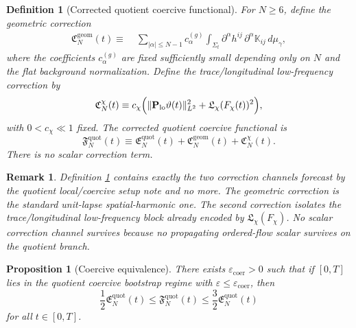 \documentclass[11pt]{article}
\newtheorem{definition}{Definition}
\newtheorem{proposition}{Proposition}
\newtheorem{remark}{Remark}
\begin{document}
\begin{definition}[Corrected quotient coercive functional]
\label{def:F}
For \(N\ge 6\), define the geometric correction
\begin{align}
\mathfrak C_N^{\mathrm{geom}}(t)
\equiv\;&
\sum_{|\alpha|\le N-1} c_\alpha^{(g)}
\int_{\Sigma_t}
\partial^\alpha h^{ij}\,
\partial^\alpha \mathbb K_{ij}\,d\mu_\gamma,
\label{eq:Cgeom}
\end{align}
where the coefficients \(c_\alpha^{(g)}\) are fixed sufficiently small depending only on \(N\) and the flat background normalization. Define the trace/longitudinal low-frequency correction by
\begin{equation}
\mathfrak C_N^{\chi}(t)
\equiv
c_\chi
\Bigl(
\|\mathbf P_{\mathrm{lo}}\vartheta(t)\|_{L^2}^2
+\mathfrak L_\chi(F_\chi(t))^2
\Bigr),
\label{eq:Cchi}
\end{equation}
with \(0<c_\chi\ll 1\) fixed. The \emph{corrected quotient coercive functional} is
\begin{equation}
\mathfrak F_N^{\mathrm{quot}}(t)
\equiv
\mathfrak E_N^{\mathrm{quot}}(t)
+\mathfrak C_N^{\mathrm{geom}}(t)
+\mathfrak C_N^{\chi}(t).
\label{eq:Fquot}
\end{equation}
There is no scalar correction term.
\end{definition}

\begin{remark}
Definition \ref{def:F} contains exactly the two correction channels forecast by the quotient local/coercive setup note and no more. The geometric correction is the standard unit-lapse spatial-harmonic one. The second correction isolates the trace/longitudinal low-frequency block already encoded by \(\mathfrak L_\chi(F_\chi)\). No scalar correction channel survives because no propagating ordered-flow scalar survives on the quotient branch.
\end{remark}

\begin{proposition}[Coercive equivalence]
\label{prop:Fequiv}
There exists \(\varepsilon_{\mathrm{coer}}>0\) such that if \([0,T]\) lies in the quotient coercive bootstrap regime with \(\varepsilon\le \varepsilon_{\mathrm{coer}}\), then
\begin{equation}
\frac12\mathfrak E_N^{\mathrm{quot}}(t)
\le
\mathfrak F_N^{\mathrm{quot}}(t)
\le
\frac32\mathfrak E_N^{\mathrm{quot}}(t)
\label{eq:Fequiv}
\end{equation}
for all \(t\in[0,T]\).
\end{proposition}
\end{document}

